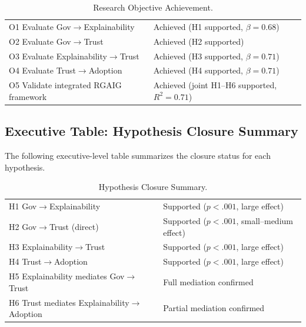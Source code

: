 {\tablestripes\tablefontsize
{}
\begin{xltabular}{\textwidth}{@{} >{\raggedright\arraybackslash}p{6cm} L @{}}
\caption[Research Objective Achievement]{Research Objective Achievement.}\label{tab:exec_objective_achievement} \\
\toprule
{} &  \\
\midrule
\endfirsthead
\endhead
\bottomrule
\endlastfoot
O1 Evaluate Gov$\rightarrow$Explainability & Achieved (H1 supported, $\beta=0.68$) \\
\addlinespace
O2 Evaluate Gov$\rightarrow$Trust & Achieved (H2 supported) \\
\addlinespace
O3 Evaluate Explainability$\rightarrow$Trust & Achieved (H3 supported, $\beta=0.71$) \\
\addlinespace
O4 Evaluate Trust$\rightarrow$Adoption & Achieved (H4 supported, $\beta=0.71$) \\
\addlinespace
O5 Validate integrated RGAIG framework & Achieved (joint H1--H6 supported, $R^2=0.71$) \\
\end{xltabular}}


\subsection{Executive Table: Hypothesis Closure Summary}
\label{sec:exec_hypothesis_closure}

\noindent The following executive-level table summarizes the closure status for each hypothesis.

{\tablestripes\tablefontsize
{}
\begin{xltabular}{\textwidth}{@{} >{\raggedright\arraybackslash}p{6cm} L @{}}
\caption[Hypothesis Closure Summary]{Hypothesis Closure Summary.}\label{tab:exec_hypothesis_closure} \\
\toprule
{} &  \\
\midrule
\endfirsthead
\endhead
\bottomrule
\endlastfoot
H1 Gov$\rightarrow$Explainability & Supported ($p<.001$, large effect) \\
\addlinespace
H2 Gov$\rightarrow$Trust (direct) & Supported ($p<.001$, small--medium effect) \\
\addlinespace
H3 Explainability$\rightarrow$Trust & Supported ($p<.001$, large effect) \\
\addlinespace
H4 Trust$\rightarrow$Adoption & Supported ($p<.001$, large effect) \\
\addlinespace
H5 Explainability mediates Gov$\rightarrow$Trust & Full mediation confirmed \\
\addlinespace
H6 Trust mediates Explainability$\rightarrow$Adoption & Partial mediation confirmed \\
\end{xltabular}}


